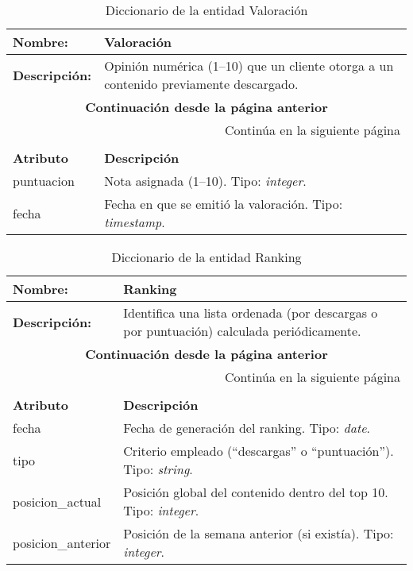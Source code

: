 \renewcommand{\arraystretch}{1.3}
\begin{longtable}{|p{3.5cm}|p{10cm}|}
\caption{Diccionario de la entidad Valoración}
\label{tab:diccionarioValoracion} \\ \hline
\textbf{Nombre:} & Valoración \\ \hline
\textbf{Descripción:} & 
Opinión numérica (1–10) que un cliente otorga a un contenido previamente descargado. \\ \hline
\endfirsthead
\multicolumn{2}{c}{\textbf{Continuación desde la página anterior}} \\ \hline
\endhead
\hline \multicolumn{2}{r}{{Continúa en la siguiente página}} \\ \hline
\endfoot
\hline
\endlastfoot
\multicolumn{2}{|p{13.5cm}|}{\textbf{ATRIBUTOS}} \\ \hline
\textbf{Atributo} & \textbf{Descripción} \\ \hline
puntuacion & Nota asignada (1–10).  
Tipo: \textit{integer}. \\ \hline
fecha      & Fecha en que se emitió la valoración.  
Tipo: \textit{timestamp}. \\ \hline
\end{longtable}

\renewcommand{\arraystretch}{1.3}
\begin{longtable}{|p{3.5cm}|p{10cm}|}
\caption{Diccionario de la entidad Ranking}
\label{tab:diccionarioRanking} \\ \hline
\textbf{Nombre:} & Ranking \\ \hline
\textbf{Descripción:} & 
 Identifica una lista ordenada (por descargas o por puntuación) calculada periódicamente. \\ \hline
\endfirsthead
\multicolumn{2}{c}{\textbf{Continuación desde la página anterior}} \\ \hline
\endhead
\hline \multicolumn{2}{r}{{Continúa en la siguiente página}} \\ \hline
\endfoot
\hline
\endlastfoot
\multicolumn{2}{|p{13.5cm}|}{\textbf{ATRIBUTOS}} \\ \hline
\textbf{Atributo} & \textbf{Descripción} \\ \hline
fecha              & Fecha de generación del ranking.  
Tipo: \textit{date}. \\ \hline
tipo               & Criterio empleado (``descargas'' o ``puntuación'').  
Tipo: \textit{string}. \\ \hline
posicion\_actual   & Posición global del contenido dentro del top 10.  
Tipo: \textit{integer}. \\ \hline
posicion\_anterior & Posición de la semana anterior (si existía).  
Tipo: \textit{integer}. \\ \hline
\end{longtable}

